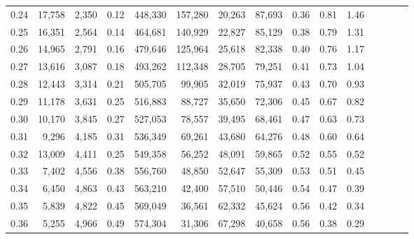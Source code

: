 \begin{tabular}{rrrcrrrrrrrrrrr}
0.24 &  17,758 &  2,350 &                                       0.12 &  448,330 &  157,280 &   20,263 &   87,693 &  0.36 &  0.81 &                         1.46 \\
0.25 &  16,351 &  2,564 &                                       0.14 &  464,681 &  140,929 &   22,827 &   85,129 &  0.38 &  0.79 &                         1.31 \\
0.26 &  14,965 &  2,791 &                                       0.16 &  479,646 &  125,964 &   25,618 &   82,338 &  0.40 &  0.76 &                         1.17 \\
0.27 &  13,616 &  3,087 &                                       0.18 &  493,262 &  112,348 &   28,705 &   79,251 &  0.41 &  0.73 &                         1.04 \\
0.28 &  12,443 &  3,314 &                                       0.21 &  505,705 &   99,905 &   32,019 &   75,937 &  0.43 &  0.70 &                         0.93 \\
0.29 &  11,178 &  3,631 &                                       0.25 &  516,883 &   88,727 &   35,650 &   72,306 &  0.45 &  0.67 &                         0.82 \\
0.30 &  10,170 &  3,845 &                                       0.27 &  527,053 &   78,557 &   39,495 &   68,461 &  0.47 &  0.63 &                         0.73 \\
0.31 &   9,296 &  4,185 &                                       0.31 &  536,349 &   69,261 &   43,680 &   64,276 &  0.48 &  0.60 &                         0.64 \\
0.32 &  13,009 &  4,411 &                                       0.25 &  549,358 &   56,252 &   48,091 &   59,865 &  0.52 &  0.55 &                         0.52 \\
0.33 &   7,402 &  4,556 &                                       0.38 &  556,760 &   48,850 &   52,647 &   55,309 &  0.53 &  0.51 &                         0.45 \\
0.34 &   6,450 &  4,863 &                                       0.43 &  563,210 &   42,400 &   57,510 &   50,446 &  0.54 &  0.47 &                         0.39 \\
0.35 &   5,839 &  4,822 &                                       0.45 &  569,049 &   36,561 &   62,332 &   45,624 &  0.56 &  0.42 &                         0.34 \\
0.36 &   5,255 &  4,966 &                                       0.49 &  574,304 &   31,306 &   67,298 &   40,658 &  0.56 &  0.38 &                         0.29 \\

\end{tabular}
